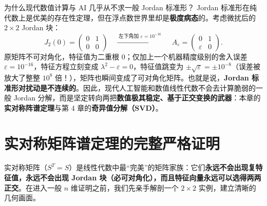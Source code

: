 \begin{failBox}{为什么现代数值计算与 AI 几乎从不求一般 Jordan 标准形？}
Jordan 标准形在纯代数上是优美的存在性定理，但在浮点数世界里却是\textbf{极度病态}的。考虑微扰后的 $2\times 2$ Jordan 块：
\[
  J_2(0) = \begin{pmatrix} 0 & 1 \\ 0 & 0 \end{pmatrix}
  \quad\xrightarrow{\;\text{左下角加 } \varepsilon = 10^{-16}\;}\quad
  A_\varepsilon = \begin{pmatrix} 0 & 1 \\ \varepsilon & 0 \end{pmatrix}.
\]
原矩阵不可对角化，特征值为二重根 $0$；仅加上一个机器精度级别的舍入误差 $\varepsilon = 10^{-16}$，特征方程立刻变成 $\lambda^2 - \varepsilon = 0$，特征值跳变为 $\pm\sqrt{\varepsilon} = \pm 10^{-8}$（误差被放大了整整 $10^8$ 倍！），矩阵也瞬间变成了可对角化矩阵。也就是说，\textbf{Jordan 标准形对扰动是不连续的}。因此，现代人工智能和数值线性代数不会去计算脆弱的一般 Jordan 分解，而是坚定转向两把\textbf{数值极其稳定、基于正交变换的武器}：本章的\textbf{实对称阵谱定理}与第 4 章的\textbf{奇异值分解（SVD）}。
\end{failBox}

\section{实对称矩阵谱定理的完整严格证明}
\label{sec:ch3-spectral}

实对称矩阵（$S^T = S$）是线性代数中最“完美”的矩阵家族：它们\textbf{永远不会出现复特征值，永远不会出现 Jordan 块（必可对角化），而且特征向量永远可以选得两两正交}。在进入一般 $n$ 维证明之前，我们先亲手解剖一个 $2\times 2$ 实例，建立清晰的几何画面。

